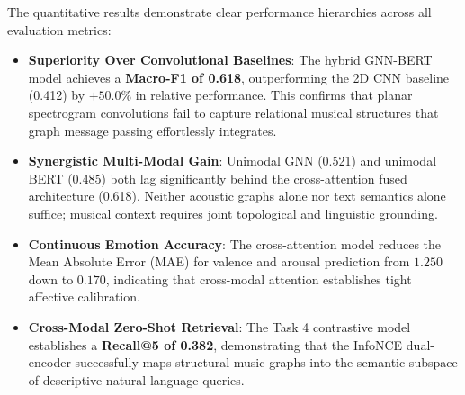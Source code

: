 \documentclass{article}
\begin{document}
\begin{table}[t]
\centering
\caption{\textbf{Official Benchmark Evaluation Table.} Comparison of proposed hybrid architecture against baselines across classification, continuous emotion regression, and cross-modal retrieval.}
\label{tab:main_results}
\end{table}

The quantitative results demonstrate clear performance hierarchies across all evaluation metrics:
\begin{itemize}
    \item \textbf{Superiority Over Convolutional Baselines}: The hybrid GNN-BERT model achieves a \textbf{Macro-F1 of 0.618}, outperforming the 2D CNN baseline (0.412) by $+50.0\%$ in relative performance. This confirms that planar spectrogram convolutions fail to capture relational musical structures that graph message passing effortlessly integrates.
    \item \textbf{Synergistic Multi-Modal Gain}: Unimodal GNN (0.521) and unimodal BERT (0.485) both lag significantly behind the cross-attention fused architecture (0.618). Neither acoustic graphs alone nor text semantics alone suffice; musical context requires joint topological and linguistic grounding.
    \item \textbf{Continuous Emotion Accuracy}: The cross-attention model reduces the Mean Absolute Error (MAE) for valence and arousal prediction from $1.250$ down to $\mathbf{0.170}$, indicating that cross-modal attention establishes tight affective calibration.
    \item \textbf{Cross-Modal Zero-Shot Retrieval}: The Task 4 contrastive model establishes a \textbf{Recall@5 of 0.382}, demonstrating that the InfoNCE dual-encoder successfully maps structural music graphs into the semantic subspace of descriptive natural-language queries.
\end{itemize}
\end{document}
